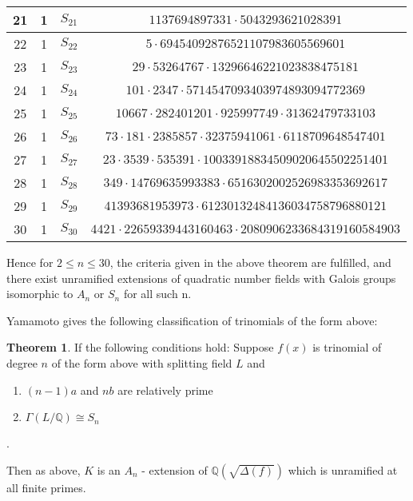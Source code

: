 \documentclass[12pt]{extarticle}
\newcommand{\Q}{\mathbb{Q}}
\newcommand{\<}{\langle}
\renewcommand{\>}{\rangle}
\theoremstyle{definition}
\newtheorem{theorem}{Theorem}
\begin{document}
\begin{center}
\begin{tabular}{||c | c | c | c||}
\hline
21 & 1 & $S_{21}$ & $1137694897331 \cdot 5043293621028391$ \\
\hline
22 & 1 & $S_{22}$ & $5 \cdot 69454092876521107983605569601$ \\
\hline
23 & 1 & $S_{23}$ & $29 \cdot 53264767 \cdot 13296646221023838475181$ \\
\hline
24 & 1 & $S_{24}$ & $101 \cdot 2347 \cdot 5714547093403974893094772369$ \\
\hline
25 & 1 & $S_{25}$ & $10667 \cdot 282401201 \cdot 925997749 \cdot 31362479733103$ \\
\hline
26 & 1 & $S_{26}$ & $73 \cdot 181 \cdot 2385857 \cdot 32375941061 \cdot 6118709648547401$ \\
\hline
27 & 1 & $S_{27}$ & $23 \cdot 3539 \cdot 535391 \cdot 10033918834509020645502251401$ \\
\hline
28 & 1 & $S_{28}$ & $349 \cdot 14769635993383 \cdot 6516302002526983353692617$ \\
\hline
29 & 1 & $S_{29}$ & $41393681953973 \cdot 61230132484136034758796880121$ \\
\hline
30 & 1 & $S_{30}$ & $4421 \cdot 22659339443160463 \cdot 2080906233684319160584903$ \\
\hline


\end{tabular}
\end{center}


Hence for $2 \leq n \leq 30$, the criteria given in the above theorem are fulfilled, and there exist unramified extensions of quadratic number fields with Galois groups isomorphic to $A_n$ or $S_n$ for all such n.  \par


Yamamoto \cite{YAMA1970} gives the following classification of trinomials of the form above:
\begin{theorem}
If the following conditions hold: Suppose $f(x)$ is trinomial of degree $n$ of the form above with splitting field $L$ and 
\begin{enumerate}
    \item $(n-1)a$ and $nb$ are relatively prime 
    \item $\Gamma(L/\Q) \cong S_n$
\end{enumerate}.\par
Then as above, $K$ is an $A_n$ - extension of $\Q\left( \sqrt{\Delta(f)}\right)$ which is unramified at all finite primes.
\end{theorem}
\end{document}
